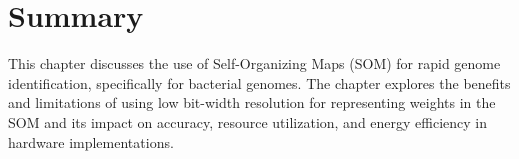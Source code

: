 \section{Summary}
\begin{comment}
In this work we explore the design space of a self-organizing map (SOM) used for rapid and accurate identification of bacterial genomes. This is an important health care problem.  The  SOM is trained on Next Generation Sequencing (NGS) data and is able to identify the exact strain of bacteria. This is in contrast to conventional methods that require genome assembly to identify the bacterial strain. In this work SOM has been implemented on FPGA. To lower the energy consumption, we exploit the robustness of SOM by successively lowering the resolution to gain further improvements in efficiency and lower the implementation cost without substantially sacrificing the accuracy. We do an in depth analysis of the reduction in resolution vs. loss in accuracy as the basis for designing a system with the lowest cost and acceptable accuracy using NGS data from  samples containing multiple bacteria from the labs of one of the co-authors. The objective of this method is to design a bacterial recognition system for battery operated clinical use where the area, power and performance are of critical importance. We demonstrate that with 39\% loss in accuracy in 12 bits and 1\% in 16 bit representation can yield significant savings in energy and area.

In this work, different bit width FPGA designs of SOM were implemented to enable trade-offs between accuracy and computation cost. Experiments has shown the big design space, resulting in different cost in terms of timing, area as well as energy, all of which are affected significantly by the fixed-point format representation. Through the experiment, we conclude that the SOM network with 16-bit fixed-point representation implemented on FPGA, has better benefits compared to other fixed-point formats with more bits. And 16-bit has acceptable classification error. Format with bits more than 16 no longer add any benefit to lower the classification error. 

In future works, we plan to apply more sophisticated methods to scale down the bit width without losing too much accuracy. For example, the weights can be dynamically scaled after several epochs of training when the current fixed point format is not suitable anymore. We are confident that, with such approximate computing techniques, we could possibly reduce the resolution to 8 bits with acceptable loss of accuracy and, by extension, the implementation cost of SOM networks on hardware.
\end{comment}
This chapter discusses the use of Self-Organizing Maps (SOM) for rapid genome identification, specifically for bacterial genomes. The chapter explores the benefits and limitations of using low bit-width resolution for representing weights in the SOM and its impact on accuracy, resource utilization, and energy efficiency in hardware implementations.

